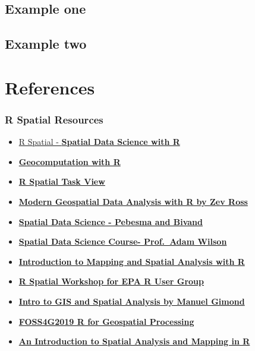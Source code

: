 \documentclass[
]{book}
\providecommand{\tightlist}{%
  \setlength{\itemsep}{0pt}\setlength{\parskip}{0pt}}
\begin{document}
\hypertarget{example-one}{%
\section{Example one}\label{example-one}}

\hypertarget{example-two}{%
\section{Example two}\label{example-two}}

\hypertarget{references}{%
\chapter*{References}\label{references}}

\hypertarget{r-spatial-resources}{%
\subsection{R Spatial Resources}\label{r-spatial-resources}}

\begin{itemize}
\tightlist
\item
  \href{http://rspatial.org/spatial/}{R Spatial - \textbf{Spatial Data Science with R}}
\item
  \href{https://geocompr.robinlovelace.net/}{\textbf{Geocomputation with R}}
\item
  \href{https://cran.r-project.org/web/views/Spatial.html}{\textbf{R Spatial Task View}}
\item
  \href{http://files.zevross.com/workshops/spatial/slides/html/0-deck-list.html}{\textbf{Modern Geospatial Data Analysis with R by Zev Ross}}
\item
  \href{https://keen-swartz-3146c4.netlify.com/}{\textbf{Spatial Data Science - Pebesma and Bivand}}
\item
  \href{http://adamwilson.us/SpatialDataScience/index.html}{\textbf{Spatial Data Science Course- Prof.~Adam Wilson}}
\item
  \href{https://cengel.github.io/rspatial/}{\textbf{Introduction to Mapping and Spatial Analysis with R}}
\item
  \href{https://mhweber.github.io/R-User-Group-Spatial-Workshop-2018/index.html}{\textbf{R Spatial Workshop for EPA R User Group}}
\item
  \href{https://mgimond.github.io/Spatial/index.html}{\textbf{Intro to GIS and Spatial Analysis by Manuel Gimond}}
\item
  \href{https://bakaniko.github.io/FOSS4G2019_Geoprocessing_with_R_workshop/}{\textbf{FOSS4G2019 R for Geospatial Processing}}
\item
  \href{https://bookdown.org/lexcomber/brunsdoncomber2e/}{\textbf{An Introduction to Spatial Analysis and Mapping in R}}
\end{itemize}
\end{document}
